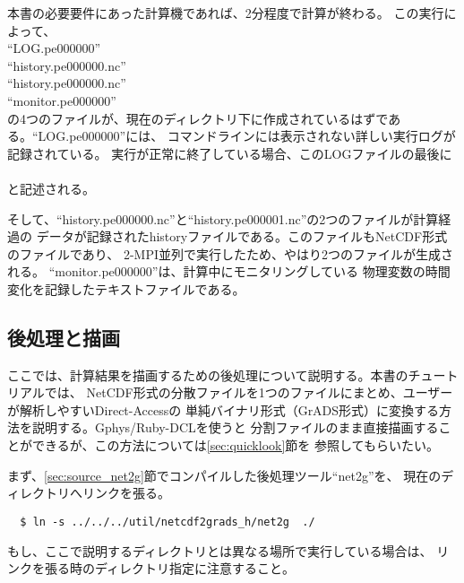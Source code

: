 本書の必要要件にあった計算機であれば、2分程度で計算が終わる。
\noindent この実行によって、\\
``LOG.pe000000''\\
``history.pe000000.nc''\\
``history.pe000000.nc''\\
``monitor.pe000000''\\
の4つのファイルが、現在のディレクトリ下に作成されているはずである。``LOG.pe000000''には、
コマンドラインには表示されない詳しい実行ログが記録されている。
実行が正常に終了している場合、このLOGファイルの最後に\\

\\

\noindent と記述される。

そして、``history.pe000000.nc''と``history.pe000001.nc''の2つのファイルが計算経過の
データが記録されたhistoryファイルである。このファイルもNetCDF形式のファイルであり、
2-MPI並列で実行したため、やはり2つのファイルが生成される。
``monitor.pe000000''は、計算中にモニタリングしている
物理変数の時間変化を記録したテキストファイルである。



\subsection{後処理と描画}
ここでは、計算結果を描画するための後処理について説明する。本書のチュートリアルでは、
NetCDF形式の分散ファイルを1つのファイルにまとめ、ユーザーが解析しやすいDirect-Accessの
単純バイナリ形式（GrADS形式）に変換する方法を説明する。Gphys/Ruby-DCLを使うと
分割ファイルのまま直接描画することができるが、この方法については\ref{sec:quicklook}節を
参照してもらいたい。

まず、\ref{sec:source_net2g}節でコンパイルした後処理ツール``net2g''を、
現在のディレクトリへリンクを張る。
\begin{verbatim}
  $ ln -s ../../../util/netcdf2grads_h/net2g  ./
\end{verbatim}
もし、ここで説明するディレクトリとは異なる場所で実行している場合は、
リンクを張る時のディレクトリ指定に注意すること。


